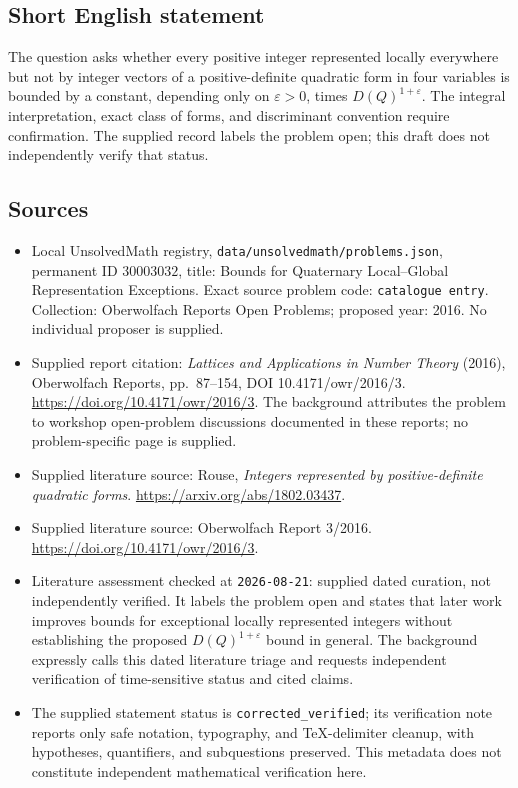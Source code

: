 \documentclass[11pt]{article}
\begin{document}
\subsection{Short English statement}
The question asks whether every positive integer represented locally everywhere but not by integer vectors of a positive-definite quadratic form in four variables is bounded by a constant, depending only on \(\varepsilon>0\), times \(D(Q)^{1+\varepsilon}\). The integral interpretation, exact class of forms, and discriminant convention require confirmation. The supplied record labels the problem open; this draft does not independently verify that status.
\subsection{Sources}
\begin{itemize}
\item Local UnsolvedMath registry, \texttt{data/unsolvedmath/problems.json}, permanent ID \(30003032\), title: Bounds for Quaternary Local--Global Representation Exceptions. Exact source problem code: \texttt{catalogue entry}. Collection: Oberwolfach Reports Open Problems; proposed year: 2016. No individual proposer is supplied.
\item Supplied report citation: \emph{Lattices and Applications in Number Theory} (2016), Oberwolfach Reports, pp.~87--154, DOI 10.4171/owr/2016/3. \url{https://doi.org/10.4171/owr/2016/3}. The background attributes the problem to workshop open-problem discussions documented in these reports; no problem-specific page is supplied.
\item Supplied literature source: Rouse, \emph{Integers represented by positive-definite quadratic forms}. \url{https://arxiv.org/abs/1802.03437}.
\item Supplied literature source: Oberwolfach Report 3/2016. \url{https://doi.org/10.4171/owr/2016/3}.
\item Literature assessment checked at \texttt{2026-08-21}: supplied dated curation, not independently verified. It labels the problem open and states that later work improves bounds for exceptional locally represented integers without establishing the proposed \(D(Q)^{1+\varepsilon}\) bound in general. The background expressly calls this dated literature triage and requests independent verification of time-sensitive status and cited claims.
\item The supplied statement status is \texttt{corrected\_verified}; its verification note reports only safe notation, typography, and TeX-delimiter cleanup, with hypotheses, quantifiers, and subquestions preserved. This metadata does not constitute independent mathematical verification here.
\end{itemize}
\end{document}
